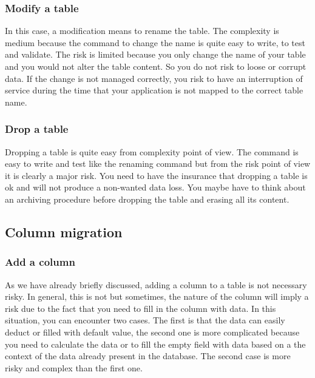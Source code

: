 \subsubsection{Modify a table\\}

In this case, a modification means to rename the table. The complexity is medium because the command to change the name is quite easy to write, to test and validate. The risk is limited because you only change the name of your table and you would not alter the table content. So you do not risk to loose or corrupt data. If the change is not managed correctly, you risk to have an interruption of service during the time that your application is not mapped to the correct table name.

\subsubsection{Drop a table\\}

Dropping a table is quite easy from complexity point of view. The command is easy to write and test like the renaming command but from the risk point of view it is clearly a major risk. You need to have the insurance that dropping a table is ok and will not produce a non-wanted data loss. You maybe have to think about an archiving procedure before dropping the table and erasing all its content.

\subsection{Column migration}

\subsubsection{Add a column\\}

As we have already briefly discussed, adding a column to a table is not necessary risky. In general, this is not but sometimes, the nature of the column will imply a risk due to the fact that you need to fill in the column with data. In this situation, you can encounter two cases. The first is that the data can easily deduct or filled with default value, the second one is more complicated because you need to calculate the data or to fill the empty field with data based on a the context of the data already present in the database. The second case is more risky and complex than the first one.

